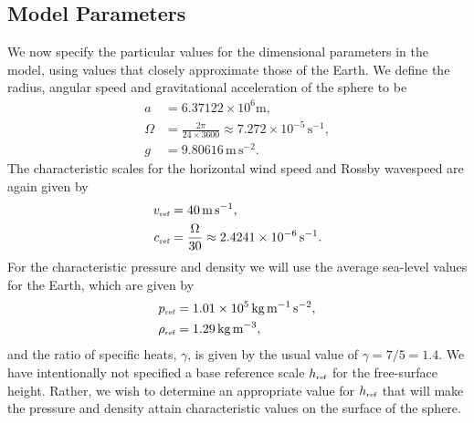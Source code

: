 \subsection{Model Parameters}
\label{subsec:comlinmodpar}
We now specify the particular values for the dimensional parameters in the model, using values that closely approximate those of the Earth. We define the radius, angular speed and gravitational acceleration of the sphere to be
\begin{align}
a&=6.37122\times10^6\text{m}, \label{eq:avalcom}\\
\Omega&=\frac{2 \pi}{24\times3600}\approx7.272\times10^{-5}\,\text{s}^{-1},\\
g&=9.80616\,\text{m}\,\text{s}^{-2}.
\end{align}
The characteristic scales for the horizontal wind speed and Rossby wavespeed are again given by
\begin{align}
v_{\mbox{\tiny ref}}&=40\,\text{m}\,\text{s}^{-1},\\
c_{\mbox{\tiny ref}}&=\frac{\Omega}{30}\approx2.4241\times10^{-6}\,\text{s}^{-1}.
\end{align}
For the characteristic pressure and density we will use the average sea-level values for the Earth, which are given by
\begin{align}
p_{\mbox{\tiny ref}} &= 1.01\times10^{5}\,\text{kg}\,\text{m}^{-1}\,\text{s}^{-2},\\
\rho_{\mbox{\tiny ref}} &= 1.29\,\text{kg}\,\text{m}^{-3}, \label{eq:rhovalcom}
\end{align}
and the ratio of specific heats, $\gamma$, is given by the usual value of $\gamma=7/5=1.4$. 
We have intentionally not specified a base reference scale $h_{\mbox{\tiny ref}}$ for the free-surface height. Rather, we wish to determine an appropriate value for $h_{\mbox{\tiny ref}}$ that will make the pressure and density attain characteristic values on the surface of the sphere.

